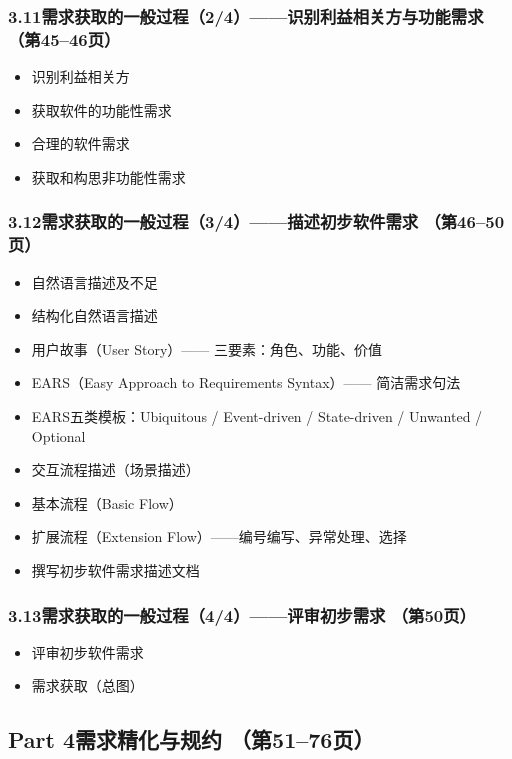 \documentclass[12pt,a4paper]{ctexart}
\begin{document}
\subsubsection{3.11\quad 需求获取的一般过程（2/4）——识别利益相关方与功能需求 \hfill（第45--46页）}
\begin{itemize}
    \item 识别利益相关方
    \item 获取软件的功能性需求
    \item 合理的软件需求
    \item 获取和构思非功能性需求
\end{itemize}

\subsubsection{3.12\quad 需求获取的一般过程（3/4）——描述初步软件需求 \hfill（第46--50页）}
\begin{itemize}
    \item 自然语言描述及不足
    \item 结构化自然语言描述
    \item 用户故事（User Story）—— 三要素：角色、功能、价值
    \item EARS（Easy Approach to Requirements Syntax）—— 简洁需求句法
    \item EARS五类模板：Ubiquitous / Event-driven / State-driven / Unwanted / Optional
    \item 交互流程描述（场景描述）
    \item 基本流程（Basic Flow）
    \item 扩展流程（Extension Flow）——编号编写、异常处理、选择
    \item 撰写初步软件需求描述文档
\end{itemize}

\subsubsection{3.13\quad 需求获取的一般过程（4/4）——评审初步需求 \hfill（第50页）}
\begin{itemize}
    \item 评审初步软件需求
    \item 需求获取（总图）
\end{itemize}

\subsection{Part 4\quad 需求精化与规约 \hfill（第51--76页）}
\end{document}
